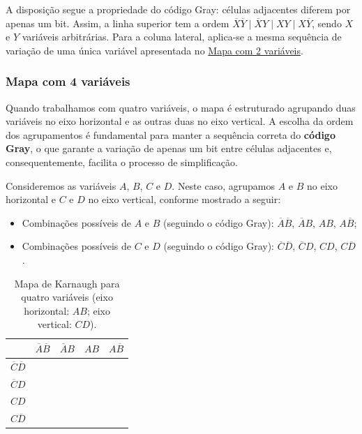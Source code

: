 \documentclass[12pt]{article}
\begin{document}
\begin{tcolorbox}[mynote, title=\textbf{Ordem das Variáveis (3 variáveis)}]
A disposição segue a propriedade do código Gray: células adjacentes diferem por apenas um bit.  
Assim, a linha superior tem a ordem $\overline{X}\overline{Y} \mid \overline{X}Y \mid XY \mid X\overline{Y}$, sendo \(X\) e \(Y\) variáveis arbitrárias.  
Para a coluna lateral, aplica-se a mesma sequência de variação de uma única variável apresentada no \hyperref[subsec:2variaveis]{Mapa com 2 variáveis}.
\end{tcolorbox}

\subsubsection{Mapa com 4 variáveis}
\label{subsec:4variaveis}

Quando trabalhamos com quatro variáveis, o mapa é estruturado agrupando duas variáveis no eixo horizontal e as outras duas no eixo vertical.  
A escolha da ordem dos agrupamentos é fundamental para manter a sequência correta do \textbf{código Gray}, o que garante a variação de apenas um bit entre células adjacentes e, consequentemente, facilita o processo de simplificação.

\vspace{0.5cm}

Consideremos as variáveis \(A\), \(B\), \(C\) e \(D\).  
Neste caso, agrupamos \(A\) e \(B\) no eixo horizontal e \(C\) e \(D\) no eixo vertical, conforme mostrado a seguir:

\begin{itemize}
    \item Combinações possíveis de \(A\) e \(B\) (seguindo o código Gray): $\overline{A}\overline{B}$, $\overline{A}B$, $AB$, $A\overline{B}$;
    \item Combinações possíveis de \(C\) e \(D\) (seguindo o código Gray): $\overline{C}\overline{D}$, $\overline{C}D$, $CD$, $C\overline{D}$.
\end{itemize}

\begin{table}[htb]
\centering
\renewcommand{\arraystretch}{1.3} %
\begin{tabular}{|c|c|c|c|c|}
\hline
 & $\overline{A}\overline{B}$ & $\overline{A}B$ & $AB$ & $A\overline{B}$ \\
\hline
$\overline{C}\overline{D}$ &  &  &  &  \\
\hline
$\overline{C}D$ &  &  &  &  \\
\hline
$CD$ &  &  &  &  \\
\hline
$C\overline{D}$ &  &  &  &  \\
\hline
\end{tabular}
\caption{Mapa de Karnaugh para quatro variáveis (eixo horizontal: \(AB\); eixo vertical: \(CD\)).}
\label{tab:karnaugh-4var}
\end{table}
\end{document}
